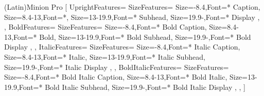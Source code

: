 \usepackage[xetex]{geometry}
\usepackage[utf8]{inputenc}
\usepackage{xcolor}
\usepackage{parskip}
\usepackage{mathtools}
\usepackage{physics}
\usepackage[xetex]{hyperref}
\usepackage{hypertoc}
\usepackage{enumitem}
\usepackage{mathspec} %
\usepackage{titlesec,titletoc}
\usepackage[singlelinecheck=false]{caption}
\usepackage{tikz}

\geometry{top=1in,bottom=1in,left=1in,right=1.375in}

\setmathfont(Latin){Minion Pro}
\setmainfont{Minion Pro}
[
	UprightFeatures={
		SizeFeatures={
			{Size={-8.4},Font=* Caption},
			{Size={8.4-13},Font=*},
			{Size={13-19.9},Font=* Subhead},
			{Size={19.9-},Font=* Display}
		},
	},
	BoldFeatures={
		SizeFeatures={ 
			{Size={-8.4},Font=* Bold Caption},
			{Size={8.4-13},Font=* Bold},
			{Size={13-19.9},Font=* Bold Subhead},
			{Size={19.9-},Font=* Bold Display}
		},
	},
	ItalicFeatures={
		SizeFeatures={ 
			{Size={-8.4},Font=* Italic Caption},
			{Size={8.4-13},Font=* Italic},
			{Size={13-19.9},Font=* Italic Subhead},
			{Size={19.9-},Font=* Italic Display}
		},
	},
	BoldItalicFeatures={
		SizeFeatures={ 
			{Size={-8.4},Font=* Bold Italic Caption},
			{Size={8.4-13},Font=* Bold Italic},
			{Size={13-19.9},Font=* Bold Italic Subhead},
			{Size={19.9-},Font=* Bold Italic Display}
		},
	},
]
\setsansfont{Myriad Pro}
\newfontfamily{}


\hypersetup{
	colorlinks=true,
	linkcolor=activeColor,
	urlcolor=activeColor,
	citecolor=activeColor,
}

